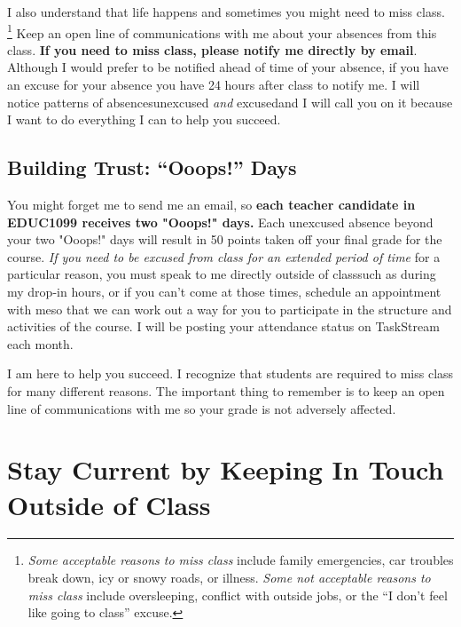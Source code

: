 \documentclass{tufte-handout}
\begin{document}
I also understand that life happens and sometimes you might need to miss class. \footnote{\textit{Some acceptable reasons to miss class} include family emergencies, car troubles break down, icy or snowy roads, or illness. \textit{Some not acceptable reasons to miss class} include oversleeping, conflict with outside jobs, or the \enquote{I don't feel like going to class} excuse.} Keep an open line of communications with me about your absences from this class. \textbf{If you need to miss class, please notify me directly by email}. Although I would prefer to be notified ahead of time of your absence, if you have an excuse for your absence you have 24 hours after class to notify me. I will notice patterns of absences\textemdash{}unexcused \emph{and} excused\textemdash{}and I will call you on it because I want to do everything I can to help you succeed.

\subsection{Building Trust: \enquote{Ooops!} Days}
You might forget me to send me an email, so \textbf{each teacher candidate in EDUC1099 receives two "Ooops!" days.} Each unexcused absence beyond your two "Ooops!" days will result in 50 points taken off your final grade for the course. \emph{If you need to be excused from class for an extended period of time} for a particular reason, you must speak to me directly outside of class\textemdash{}such as during my drop-in hours, or if you can't come at those times, schedule an appointment with me\textemdash{}so that we can work out a way for you to participate in the structure and activities of the course. I will be posting your attendance status on TaskStream each month.

 I am here to help you succeed. I recognize that students are required to miss class for many different reasons. The important thing to remember is to keep an open line of communications with me so your grade is not adversely affected.


\section{Stay Current by Keeping In Touch Outside of Class}
\end{document}
